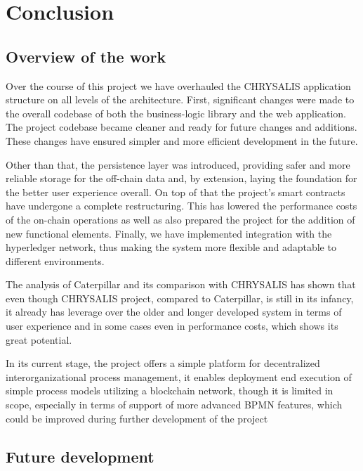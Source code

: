 %
\chapter{Conclusion}
\label{sec:conclusion}

\section{Overview of the work}
\label{sec:conclusion:overview}
Over the course of this project we have overhauled the CHRYSALIS application structure on all levels of the architecture. First, significant changes were made to the overall codebase of both the business-logic library and the web application. The project codebase became cleaner and ready for future changes and additions. These changes have ensured simpler and more efficient development in the future.

Other than that, the persistence layer was introduced, providing safer and more reliable storage for the off-chain data and, by extension, laying the  foundation for the better user experience overall. On top of that the project's smart contracts have undergone a complete restructuring. This has lowered the performance costs of the on-chain operations as well as also prepared the project for the addition of new functional elements. Finally, we have implemented integration with the hyperledger network, thus making the system more flexible and adaptable to different environments.

The analysis of Caterpillar and its comparison with CHRYSALIS has shown that even though CHRYSALIS project, compared to Caterpillar, is still in its infancy, it already has leverage over the older and longer developed system in terms of user experience and in some cases even in performance costs, which shows its great potential.

In its current stage, the project offers a simple platform for decentralized interorganizational process management, it enables deployment end execution of simple process models utilizing a blockchain network, though it is limited in scope, especially in terms of support of more advanced BPMN features, which could be improved during further development of the project

\section{Future development}
\label{sec:conclusion:future}

